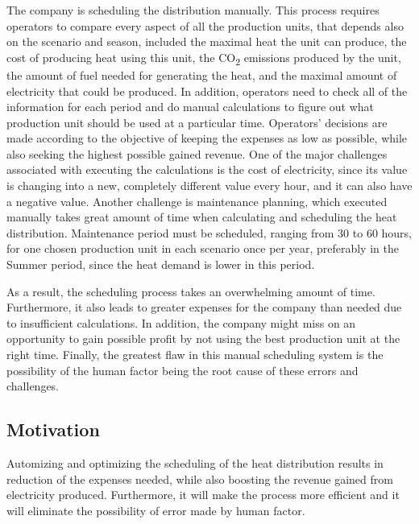\vspace{0.5cm}

\noindent The company is scheduling the distribution manually. This process requires operators to compare every aspect of all the production units, that depends also on the scenario and season, included the maximal heat the unit can produce, the cost of producing heat using this unit, the CO\textsubscript{2} emissions produced by the unit, the amount of fuel needed for generating the heat, and the maximal amount of electricity that could be produced. In addition, operators need to check all of the information for each period and do manual calculations to figure out what production unit should be used at a particular time. Operators' decisions are made according to the objective of keeping the expenses as low as possible, while also seeking the highest possible gained revenue.
One of the major challenges associated with executing the calculations is the cost of electricity, since its value is changing into a new, completely different value every hour, and it can also have a negative value. Another challenge is maintenance planning, which executed manually takes great amount of time when calculating and scheduling the heat distribution. Maintenance period must be scheduled, ranging from 30 to 60 hours, for one chosen production unit in each scenario once per year, preferably in the Summer period, since the heat demand is lower in this period.

\vspace{0.5cm}

\noindent As a result, the scheduling process takes an overwhelming amount of time. Furthermore, it also leads to greater expenses for the company than needed due to insufficient calculations. In addition, the company might miss on an opportunity to gain possible profit by not using the best production unit at the right time. Finally, the greatest flaw in this manual scheduling system is the possibility of the human factor being the root cause of these errors and challenges.

\subsection{Motivation}
Automizing and optimizing the scheduling of the heat distribution results in reduction of the expenses needed, while also boosting the revenue gained from electricity produced. Furthermore, it will make the process more efficient and it will eliminate the possibility of error made by human factor.

